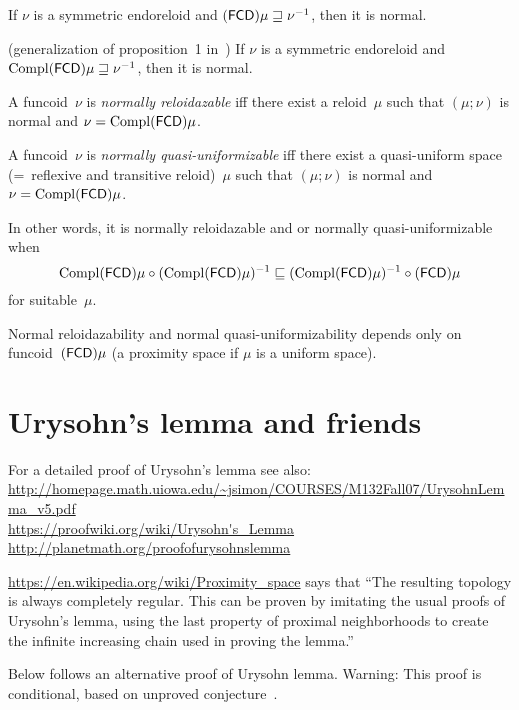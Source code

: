 \begin{cor}
If $\nu$ is a symmetric endoreloid and $(\mathsf{FCD}) \mu\sqsupseteq \nu^{-1}$, then it is normal.
\end{cor}

\begin{cor} (generalization of proposition~1 in~\cite{2014arXiv1410.1504B})
If $\nu$ is a symmetric endoreloid and $\operatorname{Compl}(\mathsf{FCD}) \mu\sqsupseteq \nu^{-1}$, then it is normal.
\end{cor}

\begin{defn}
A funcoid~$\nu$ is \emph{normally reloidazable} iff there exist a reloid~$\mu$ such that
$(\mu;\nu)$ is normal and $\nu=\operatorname{Compl}(\mathsf{FCD})\mu$.
\end{defn}

\begin{defn}
A funcoid~$\nu$ is \emph{normally quasi-uniformizable} iff there exist a quasi-uniform space (=~reflexive and transitive reloid)~$\mu$ such that
$(\mu;\nu)$ is normal and $\nu=\operatorname{Compl}(\mathsf{FCD})\mu$.
\end{defn}

In other words, it is normally reloidazable and or normally quasi-uniformizable when
\[ \operatorname{Compl}(\mathsf{FCD})\mu\circ(\operatorname{Compl}(\mathsf{FCD})\mu)^{-1}\sqsubseteq(\operatorname{Compl}(\mathsf{FCD})\mu)^{-1}\circ(\mathsf{FCD})\mu \]
for suitable~$\mu$.

Normal reloidazability and normal quasi-uniformizability depends only on funcoid~$(\mathsf{FCD})\mu$ (a proximity space if $\mu$ is a uniform space).

\section{Urysohn's lemma and friends}

For a detailed proof of Urysohn's lemma see also:\\
\url{http://homepage.math.uiowa.edu/~jsimon/COURSES/M132Fall07/UrysohnLemma_v5.pdf}\\
\url{https://proofwiki.org/wiki/Urysohn's_Lemma}\\
\url{http://planetmath.org/proofofurysohnslemma}

\url{https://en.wikipedia.org/wiki/Proximity_space} says that
``The resulting topology is always completely regular. This can be proven by imitating the usual proofs of Urysohn's lemma, using the last property of proximal neighborhoods to create the infinite increasing chain used in proving the lemma.''

Below follows an alternative proof of Urysohn lemma. Warning: This proof is conditional,
based on unproved conjecture~.

